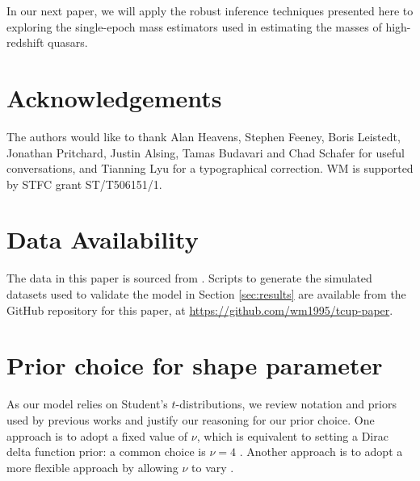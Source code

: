\documentclass[fleqn,usenatbib]{rasti}
\begin{document}
In our next paper, we will apply the robust inference techniques presented here
to exploring the single-epoch mass estimators used in estimating the masses of
high-redshift quasars.

\section*{Acknowledgements}

The authors would like to thank Alan Heavens, Stephen Feeney, Boris Leistedt,
Jonathan Pritchard, Justin Alsing, Tamas Budavari and Chad Schafer for useful
conversations, and Tianning Lyu for a typographical correction. WM is supported
by STFC grant ST/T506151/1.

\section*{Data Availability}

The data in this paper is sourced from \citet{Kelly:2007, Park:2017}. Scripts to
generate the simulated datasets used to validate the model in Section
\ref{sec:results} are available from the GitHub repository for this paper, at
\url{https://github.com/wm1995/tcup-paper}.







\appendix

\section{Prior choice for shape parameter}
\label{sec:t-prior}

As our model relies on Student's $t$-distributions, we review notation and
priors used by previous works and justify our reasoning for our prior choice.
One approach is to adopt a fixed value of $\nu$, which is equivalent to setting
a Dirac delta function prior: a common choice is $\nu = 4$
\citep[e.g.][]{Berger:1994, Gelman:2013}.  Another approach is to adopt a more
flexible approach by allowing $\nu$ to vary \citep[e.g.][]{Juarez:2010,
Gelman:2013, Ding:2014, Park:2017, Feeney:2018}.
\end{document}
